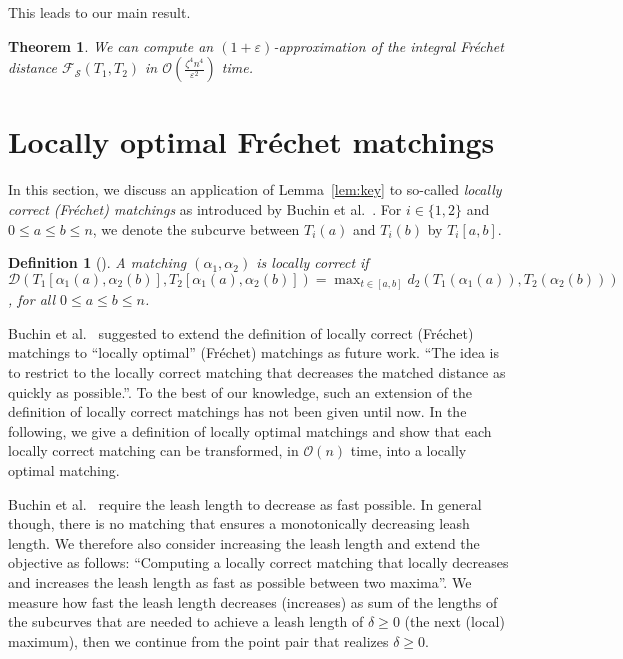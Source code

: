 \documentclass[a4paper,11pt]{article}
\newtheorem{definition}{Definition}
\newtheorem{theorem}{Theorem}
\begin{document}
This leads to our main result.
\begin{theorem}
	We can compute an $(1+\varepsilon)$-approximation of the integral Fr\'echet distance $\mathcal{F}_{\mathcal{S}} \left( T_1, T_2 \right)$ in $\mathcal{O}(\frac{\zeta^4 n^4}{\varepsilon^2})$ time.
\end{theorem}

\section{Locally optimal Fr\'{e}chet matchings}

In this section, we discuss an application of Lemma~\ref{lem:key} to so-called \emph{locally correct (Fr\'{e}chet) matchings} as introduced by Buchin et al.~\cite{buchin:locally}. For $i \in \{ 1,2 \}$ and $0 \leq a \leq b \leq n$, we denote the subcurve between $T_i(a)$ and $T_i(b)$ by $T_i[a,b]$.
\begin{definition}[\cite{buchin:locally}]\label{def:correct}
	A matching $(\alpha_1,\alpha_2)$ is \emph{locally correct} if 
	$\mathscr{D} \left( T_1[\alpha_1(a),\alpha_2(b)], T_2[\alpha_1(a),\alpha_2(b)] \right) = \max_{t \in [a,b]} d_2(T_1(\alpha_1(a)),T_2(\alpha_2(b)))$, for all $0 \leq a \leq b \leq n$.
\end{definition}

	Buchin et al.~\cite{buchin:locally} suggested to extend the definition of locally correct (Fr\'{e}chet) matchings to ``locally optimal'' (Fr\'{e}chet) matchings as future work. ``The idea is to restrict to the locally correct matching that decreases the matched distance as quickly as possible.''\cite[p. 237]{buchin:locally}. To the best of our knowledge, such an extension of the definition of locally correct matchings has not been given until now. In the following, we give a definition of locally optimal matchings and show that each locally correct matching 
can be transformed, in $\mathcal{O}(n)$ time, into a locally optimal matching.
	
	Buchin et al.~\cite{buchin:locally} require the leash length to decrease as fast possible. In general though, there is no matching that ensures a monotonically decreasing leash length. We therefore also consider increasing the leash length and extend the objective as follows: ``Computing a locally correct matching that locally decreases and increases the leash length as fast as possible between two maxima''. We measure how fast the leash length decreases (increases) as sum of the lengths of the subcurves that are needed to achieve a leash length of $\delta \geq 0$ (the next (local) maximum), then we continue from the point pair that realizes $\delta \geq 0$.
	
\end{document}
